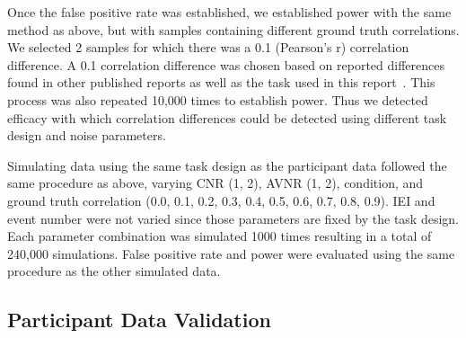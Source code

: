 \documentclass[phd,figures,tables,ackpage,abstractpage,publicabstractpage]{uithesis}
\begin{document}
Once the false positive rate was established, we established power with the same method as above,
but with samples containing different ground truth correlations.
We selected 2 samples for which there was a 0.1 (Pearson's r) correlation difference.
A 0.1 correlation difference was chosen based on reported differences found in other published
reports as well as the task used in this report~\cite{Katsura2014,Lee2017,Turner2017,Lin2019,Huang2019}.
This process was also repeated 10,000 times to establish power.
Thus we detected efficacy with which correlation differences could be detected
using different task design and noise parameters.

Simulating data using the same task design as the participant data followed the same
procedure as above, varying CNR (1, 2), AVNR (1, 2), condition,
and ground truth correlation (0.0, 0.1, 0.2, 0.3, 0.4, 0.5, 0.6, 0.7, 0.8, 0.9).
IEI and event number were not varied since those parameters are fixed by the
task design.
Each parameter combination was simulated 1000 times resulting in a total of 240,000 simulations.
False positive rate and power were evaluated using the same procedure as the other simulated data.

\subsection{Participant Data Validation}
\label{methods:task-switch}
\end{document}
